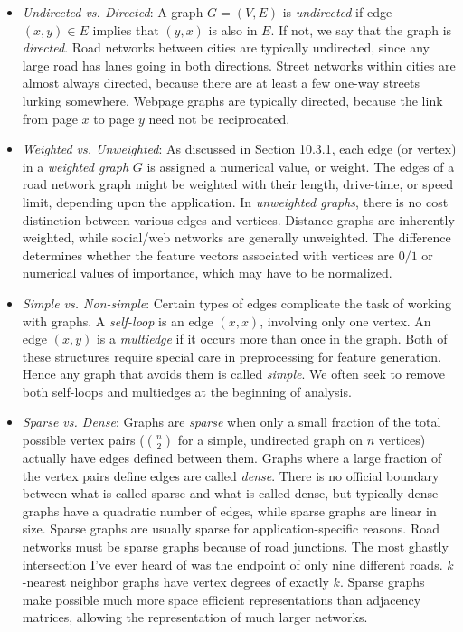 \documentclass[10pt]{article}
\begin{document}
\begin{itemize}
    \item \textit{Undirected vs. Directed}: A graph $G = (V, E)$ is \textit{undirected} if edge $(x, y) \in E$ implies that $(y, x)$ is also in $E$. If not, we say that the graph is \textit{directed}. Road networks between cities are typically undirected, since any large road has lanes going in both directions. Street networks within cities are almost always directed, because there are at least a few one-way streets lurking somewhere. Webpage graphs are typically directed, because the link from page $x$ to page $y$ need not be reciprocated.
    \item \textit{Weighted vs. Unweighted}: As discussed in Section 10.3.1, each edge (or vertex) in a \textit{weighted graph} $G$ is assigned a numerical value, or weight. The edges of a road network graph might be weighted with their length, drive-time, or speed limit, depending upon the application. In \textit{unweighted graphs}, there is no cost distinction between various edges and vertices. Distance graphs are inherently weighted, while social/web networks are generally unweighted. The difference determines whether the feature vectors associated with vertices are $0/1$ or numerical values of importance, which may have to be normalized.
    \item \textit{Simple vs. Non-simple}: Certain types of edges complicate the task of working with graphs. A \textit{self-loop} is an edge $(x, x)$, involving only one vertex. An edge $(x, y)$ is a \textit{multiedge} if it occurs more than once in the graph. Both of these structures require special care in preprocessing for feature generation. Hence any graph that avoids them is called \textit{simple}. We often seek to remove both self-loops and multiedges at the beginning of analysis.
    \item \textit{Sparse vs. Dense}: Graphs are \textit{sparse} when only a small fraction of the total possible vertex pairs ($\binom{n}{2}$ for a simple, undirected graph on $n$ vertices) actually have edges defined between them. Graphs where a large fraction of the vertex pairs define edges are called \textit{dense}. There is no official boundary between what is called sparse and what is called dense, but typically dense graphs have a quadratic number of edges, while sparse graphs are linear in size. Sparse graphs are usually sparse for application-specific reasons. Road networks must be sparse graphs because of road junctions. The most ghastly intersection I've ever heard of was the endpoint of only nine different roads. $k$-nearest neighbor graphs have vertex degrees of exactly $k$. Sparse graphs make possible much more space efficient representations than adjacency matrices, allowing the representation of much larger networks.

\end{itemize}
\end{document}
